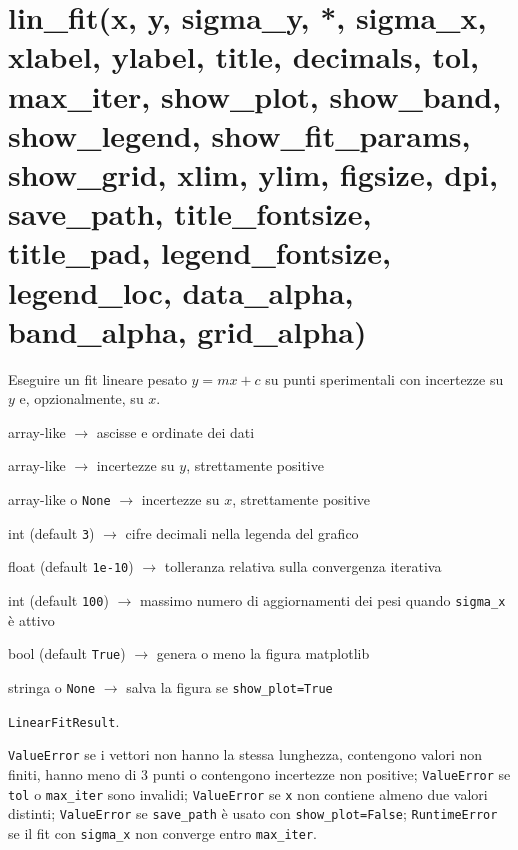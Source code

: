 \section{\texorpdfstring{lin\_fit(x, y, sigma\_y, *, sigma\_x, xlabel, ylabel, title, decimals, tol, max\_iter, show\_plot, show\_band, show\_legend, show\_fit\_params, show\_grid, xlim, ylim, figsize, dpi, save\_path, title\_fontsize, title\_pad, legend\_fontsize, legend\_loc, data\_alpha, band\_alpha, grid\_alpha)}{lin\_fit(x, y, sigma_y, *, sigma_x, xlabel, ylabel, title, decimals, tol, max_iter, show_plot, show_band, show_legend, show_fit_params, show_grid, xlim, ylim, figsize, dpi, save_path, title_fontsize, title_pad, legend_fontsize, legend_loc, data_alpha, band_alpha, grid_alpha)}}
\label{sec:fit-lineare}
\begin{apidesc}
  \item[\textbf{Scopo}]
    Eseguire un fit lineare pesato \(y = mx + c\) su punti sperimentali con incertezze su \(y\) e, opzionalmente, su \(x\).
  \item[\textbf{Parametri chiave}]\hfill
    \begin{description}[font=\normalfont\ttfamily\bfseries, labelwidth=8em, leftmargin=8.5em, itemsep=1pt, parsep=0pt, topsep=2pt]
      \item[x, y] array-like $\to$ ascisse e ordinate dei dati
      \item[sigma\_y] array-like $\to$ incertezze su \(y\), strettamente positive
      \item[sigma\_x] array-like o \texttt{None} $\to$ incertezze su \(x\), strettamente positive
      \item[decimals] int (default \texttt{3}) $\to$ cifre decimali nella legenda del grafico
      \item[tol] float (default \texttt{1e-10}) $\to$ tolleranza relativa sulla convergenza iterativa
      \item[max\_iter] int (default \texttt{100}) $\to$ massimo numero di aggiornamenti dei pesi quando \texttt{sigma\_x} è attivo
      \item[show\_plot] bool (default \texttt{True}) $\to$ genera o meno la figura matplotlib
      \item[save\_path] stringa o \texttt{None} $\to$ salva la figura se \texttt{show\_plot=True}
    \end{description}
  \item[\textbf{Restituisce}]
    \texttt{LinearFitResult}.
  \item[\textbf{Eccezioni}]
    \texttt{ValueError} se i vettori non hanno la stessa lunghezza, contengono valori non finiti, hanno meno di 3 punti o contengono incertezze non positive;
    \texttt{ValueError} se \texttt{tol} o \texttt{max\_iter} sono invalidi;
    \texttt{ValueError} se \texttt{x} non contiene almeno due valori distinti;
    \texttt{ValueError} se \texttt{save\_path} è usato con \texttt{show\_plot=False};
    \texttt{RuntimeError} se il fit con \texttt{sigma\_x} non converge entro \texttt{max\_iter}.
\end{apidesc}

